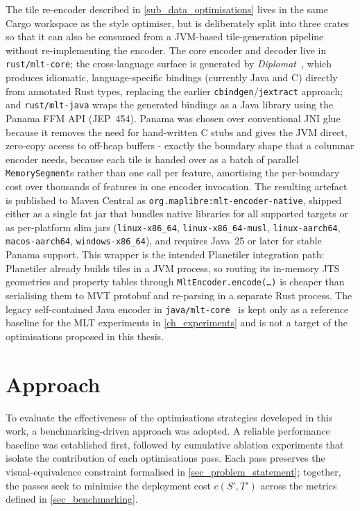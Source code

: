 The tile re-encoder described in \cref{sub_data_optimisations} lives in the same Cargo workspace as the style optimiser, but is deliberately split into three crates so that it can also be consumed from a \ac{JVM}-based tile-generation pipeline without re-implementing the encoder.
The core encoder and decoder live in \texttt{rust/mlt-core}; the cross-language surface is generated by \emph{Diplomat}~\cite{AuroraRFC77Diplomat}, which produces idiomatic, language-specific bindings (currently Java and C) directly from annotated Rust types, replacing the earlier \texttt{cbindgen}/\texttt{jextract} approach; and \texttt{rust/mlt-java} wraps the generated bindings as a Java library using the Panama \ac{FFM} \ac{API} (JEP~454).
Panama was chosen over conventional \ac{JNI} glue because it removes the need for hand-written C stubs and gives the \ac{JVM} direct, zero-copy access to off-heap buffers - exactly the boundary shape that a columnar encoder needs, because each tile is handed over as a batch of parallel \texttt{MemorySegment}s rather than one call per feature, amortising the per-boundary cost over thousands of features in one encoder invocation.
The resulting artefact is published to Maven Central as \texttt{org.maplibre:mlt-encoder-native}, shipped either as a single fat jar that bundles native libraries for all supported targets or as per-platform slim jars (\texttt{linux-x86\_64}, \texttt{linux-x86\_64-musl}, \texttt{linux-aarch64}, \texttt{macos-aarch64}, \texttt{windows-x86\_64}), and requires Java~25 or later for stable Panama support.
This wrapper is the intended Planetiler integration path: Planetiler already builds tiles in a \ac{JVM} process, so routing its in-memory \ac{JTS} geometries and property tables through \texttt{MltEncoder.encode(\ldots)} is cheaper than serialising them to \ac{MVT} protobuf and re-parsing in a separate Rust process.
The legacy self-contained Java encoder in \texttt{java/mlt-core}~\cite{tremmelMapLibreTileNext2025} is kept only as a reference baseline for the \ac{MLT} experiments in \cref{ch_experiments} and is not a target of the optimisations proposed in this thesis.

\section{Approach}\label{sec_approach}

To evaluate the effectiveness of the optimisations strategies developed in this work, a benchmarking-driven approach was adopted.
A reliable performance baseline was established first, followed by cumulative ablation experiments that isolate the contribution of each optimisations pass.
Each pass preserves the visual-equivalence constraint formalised in \cref{sec_problem_statement}; together, the passes seek to minimise the deployment cost $c(S', T')$ across the metrics defined in \cref{sec_benchmarking}.

